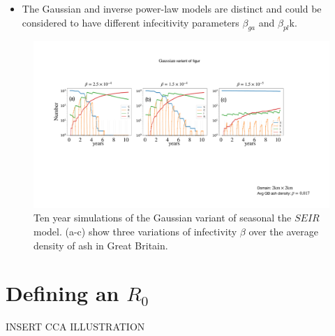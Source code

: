 \label{section:ga-SEIR-variant}
\begin{itemize}
    \item The Gaussian and inverse power-law models are distinct and could be considered to have different infecitivity parameters $\beta_{ga}$ and $\beta_{pl}$k.
\end{itemize}
\begin{figure}
    \centering
    \includegraphics[scale=0.30]{appendix/figures/A-ch6-ga-seir.pdf}
    \caption{Ten year simulations of the Gaussian variant of seasonal the $SEIR$ model. (a-c) show three variations of infectivity $\beta$ over the average density of ash in Great Britain.}
    \label{fig-ga-SEIR-variant}
\end{figure}


\section{Defining an $R_0$}



INSERT CCA ILLUSTRATION